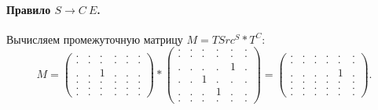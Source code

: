 \paragraph{Правило $S \to C\ E$.}
Вычисляем промежуточную матрицу $M = TSrc^S * T^C$:
{
    \renewcommand{\arraystretch}{0.7}
    \setlength\arraycolsep{2pt}
\[
    M =
    \begin{pmatrix}
    . & . & . & . & . & . \\
    . & . & . & . & . & . \\
    . & . & 1 & . & . & . \\
    . & . & . & . & . & . \\
    . & . & . & . & . & . \\
    . & . & . & . & . & .
    \end{pmatrix} *
    \begin{pmatrix}
    . & . & . & . & . & . \\
    . & . & . & . & . & . \\
    . & . & . & . & 1 & . \\
    . & . & 1 & . & . & . \\
    . & . & . & 1 & . & . \\
    . & . & . & . & . & .
    \end{pmatrix} =
    \begin{pmatrix}
    . & . & . & . & . & . \\
    . & . & . & . & . & . \\
    . & . & . & . & 1 & . \\
    . & . & . & . & . & . \\
    . & . & . & . & . & . \\
    . & . & . & . & . & .
    \end{pmatrix}.
\]
}

